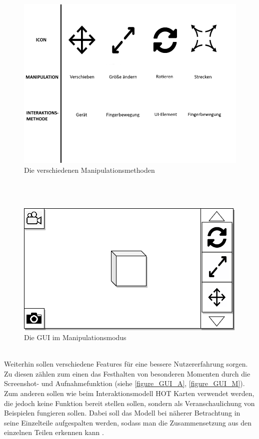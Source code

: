 \documentclass[12pt,a4paper, oneside]{scrartcl}
\begin{document}
\begin{figure}[ht!]
\includegraphics[scale=0.375]{Manipulationsmethoden}
\caption{Die verschiedenen Manipulationsmethoden}
\label{figure_M}
\end{figure}
%
\\
%
\\
\begin{figure}[ht!]
\includegraphics[scale=0.5]{GUIManipulationsmodus}
\caption{Die GUI im Manipulationsmodus}
\label{figure_GUI_M}
\end{figure}
%
\\
Weiterhin sollen verschiedene Features für eine bessere Nutzererfahrung sorgen. Zu diesen zählen zum einen das Festhalten von besonderen Momenten durch die Screenshot- und Aufnahmefunktion (siehe \autoref{figure_GUI_A}, \autoref{figure_GUI_M}).\\
Zum anderen sollen wie beim Interaktionsmodell HOT Karten verwendet werden, die jedoch keine Funktion bereit stellen sollen, sondern als Veranschaulichung von Beispielen fungieren sollen. Dabei soll das Modell bei näherer Betrachtung in seine Einzelteile aufgespalten werden, sodass man die Zusammensetzung aus den einzelnen Teilen erkennen kann \cite{youtube_unity}. \\
\end{document}
